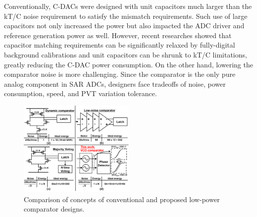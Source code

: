 \documentclass[journal]{IEEEtran}
\begin{document}

Conventionally, C-DACs were designed with unit capacitors much larger than the kT/C noise requirement to satisfy the mismatch requirements. Such use of large capacitors not only increased the power but also impacted the ADC driver and reference generation power as well. However, recent researches showed that capacitor matching requirements can be significantly relaxed by fully-digital background calibrations \cite{liu201012b,liu201112,mcneill2011all,mcneill2005split} and unit capacitors can be shrunk to kT/C limitations, greatly reducing the C-DAC power consumption. 
On the other hand, lowering the comparator noise is more challenging. Since the comparator is the only pure analog component in SAR ADCs, designers face tradeoffs of noise, power consumption, speed, and PVT variation tolerance.

\begin{figure}[!]
\centering
 \includegraphics[width=0.5\textwidth]{figs/fig1.png}
  \caption{Comparison of concepts of conventional and proposed low-power comparator designs.}
  \label{fig1}
\end{figure}
\end{document}
